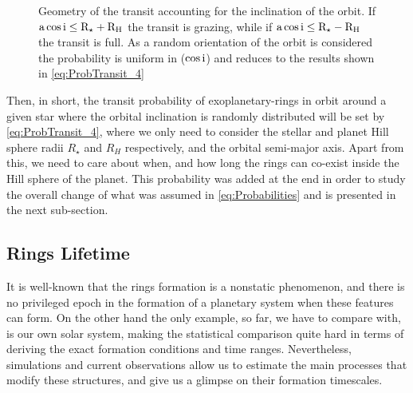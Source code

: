 \begin{figure}[!ht]
\centering
\caption{\scriptsize{Geometry of the transit accounting for the inclination of the orbit. If $\textnormal{a} \cos \textnormal{i} \leq \textnormal{R}_\star + \textnormal{R}_\textnormal{H}$ the transit is grazing, while if $\textnormal{a} \cos \textnormal{i} \leq \textnormal{R}_\star - \textnormal{R}_\textnormal{H}$ the transit is full. As a random orientation of the orbit is considered the probability is uniform in ($\cos \textnormal{i}$) and reduces to the results shown in \autoref{eq:ProbTransit_4}}}
\label{fig:Transit_3}
\end{figure}

Then, in short, the transit probability of exoplanetary-rings in orbit around a given star where the orbital inclination is randomly distributed will be set by \autoref{eq:ProbTransit_4}, where we only need to consider the stellar and planet Hill sphere radii $R_\star$ and $R_H$ respectively, and the orbital semi-major axis. Apart from this, we need to care about when, and how long the rings can co-exist inside the Hill sphere of the planet. This probability was added at the end in order to study the overall change of what was assumed in \autoref{eq:Probabilities} and is presented in the next sub-section. 

\subsection{Rings Lifetime} \label{subsec:RingsSec}

It is well-known that the rings formation is a nonstatic phenomenon, and there is no privileged epoch in the formation of a planetary system when these features can form. On the other hand the only example, so far, we have to compare with, is our own solar system, making the statistical comparison quite hard in terms of deriving the exact formation conditions and time ranges. Nevertheless, simulations and current observations allow us to estimate the main processes that modify these structures, and give us a glimpse on their formation timescales.\\

